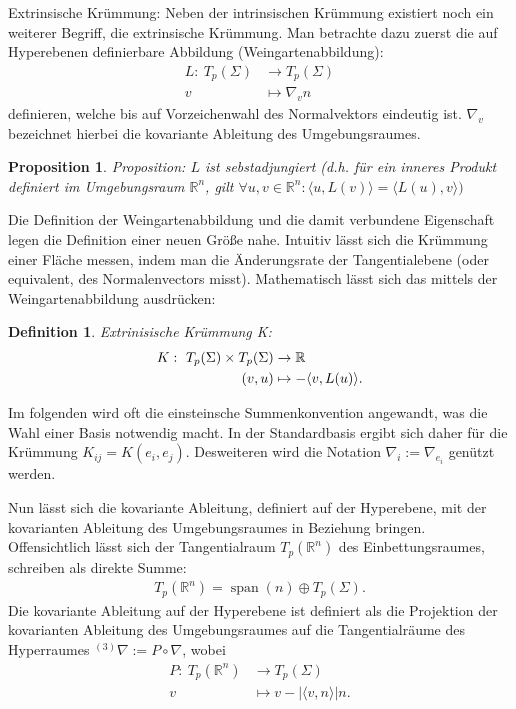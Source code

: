\documentclass{scrartcl}
\newtheorem{definition}{Definition}
\newtheorem{proposition}{Proposition}
\newcommand{\inHS}{{}^{(3)}\!}
\begin{document}
		\begin{paragraph}{Extrinsische Krümmung:} Neben der intrinsischen Krümmung existiert noch ein weiterer Begriff, die extrinsische Krümmung. Man betrachte
		dazu zuerst die auf Hyperebenen definierbare Abbildung (Weingartenabbildung):
		\begin{align*}
			L:\ T_p(\Sigma)&\rightarrow T_p(\Sigma) \\
				v&\mapsto \nabla_v n
		\end{align*}
		definieren, welche bis auf Vorzeichenwahl des Normalvektors eindeutig ist. $\nabla_v$ bezeichnet hierbei die kovariante Ableitung 
		des Umgebungsraumes.
		\begin{proposition}{Proposition:} $L$ ist sebstadjungiert (d.h. für ein inneres Produkt definiert im Umgebungsraum $\mathbb{R}^n$, gilt 
			$\forall u,v\in \mathbb{R}^n:\langle u,L(v)\rangle=\langle L(u),v\rangle)$ 
		\end{proposition}
		Die Definition der Weingartenabbildung und die damit verbundene Eigenschaft legen die Definition einer neuen Größe nahe.
		Intuitiv lässt sich die Krümmung einer Fläche messen, indem man die Änderungsrate der Tangentialebene (oder equivalent, des Normalenvectors misst).
		Mathematisch lässt sich das mittels der Weingartenabbildung ausdrücken:
		\begin{definition} Extrinisische Krümmung K:
			\begin{align}
				K:\ T_p(\Sigma)\times T_p(\Sigma)&\rightarrow \mathbb{R} \label{def:extrcurv} \\
					(v,u)&\mapsto -\langle v,L(u)\rangle.\notag
			\end{align}
		\end{definition}
		Im folgenden wird oft die einsteinsche Summenkonvention angewandt, was die Wahl einer Basis notwendig macht. In der Standardbasis
		ergibt sich daher für die Krümmung $K_{ij}=K(e_i,e_j)$. Desweiteren wird die Notation $\nabla_i:=\nabla_{e_i}$ genützt werden.

		Nun lässt sich die kovariante Ableitung, definiert auf der Hyperebene, mit der kovarianten Ableitung des Umgebungsraumes in Beziehung bringen.
		Offensichtlich lässt sich der Tangentialraum $T_p(\mathbb{R}^n)$ des Einbettungsraumes, schreiben als direkte Summe:
		\begin{align}
			T_p(\mathbb{R}^n) = \operatorname{span}(n)\oplus T_p(\Sigma).
		\end{align}
		Die kovariante Ableitung auf der Hyperebene ist definiert als die Projektion der kovarianten Ableitung des Umgebungsraumes auf die Tangentialräume
		des Hyperraumes $\inHS\nabla:=P\circ \nabla$, wobei
		\begin{align*}
			P:\ T_p(\mathbb{R}^n)&\rightarrow T_p(\Sigma)\\
				v&\mapsto v-|\langle v,n\rangle| n.
		\end{align*}
		

\end{paragraph}
\end{document}
